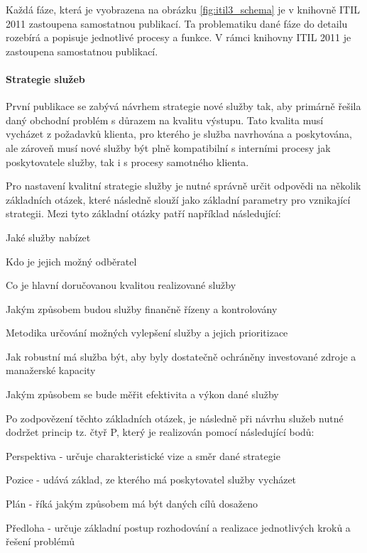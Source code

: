 \documentclass[
  digital,     %
  twoside,     %
  lof,         %
  lot,         %
]{fithesis4}
\begin{document}
Každá fáze, která je vyobrazena na obrázku \ref{fig:itil3_schema} je v knihovně ITIL 2011 zastoupena samostatnou publikací. Ta problematiku dané fáze do detailu rozebírá a popisuje jednotlivé procesy a funkce. V rámci knihovny ITIL 2011 je zastoupena samostatnou publikací. 
\paragraph{Strategie služeb}
První publikace se zabývá návrhem strategie nové služby tak, aby primárně řešila daný obchodní problém s důrazem na kvalitu výstupu. Tato kvalita musí vycházet z požadavků klienta, pro kterého je služba navrhována a poskytována, ale zároveň musí nové služby být plně kompatibilní s interními procesy jak poskytovatele služby, tak i s procesy samotného klienta.\parencite[s.~12-13]{Carlidge2007}

Pro nastavení kvalitní strategie služby je nutné správně určit odpovědi na několik základních otázek, které následně slouží jako základní parametry pro vznikající strategii.\parencite[s.~32]{Matula2017} Mezi tyto základní otázky patří například následující:

\begin{compactitem}
  \item Jaké služby nabízet
  \item Kdo je jejich možný odběratel
  \item Co je hlavní doručovanou kvalitou realizované služby
  \item Jakým způsobem budou služby finančně řízeny a kontrolovány
  \item Metodika určování možných vylepšení služby a jejich prioritizace
  \item Jak robustní má služba být, aby byly dostatečně ochráněny investované zdroje a manažerské kapacity
  \item Jakým způsobem se bude měřit efektivita a výkon dané služby
\end{compactitem}

Po zodpovězení těchto základních otázek, je následně při návrhu služeb nutné dodržet princip tz. čtyř P, který je realizován pomocí následující bodů:\parencite[s.~13]{Carlidge2007}
\begin{compactitem}
    \item Perspektiva - určuje charakteristické vize a směr dané strategie
    \item Pozice - udává základ, ze kterého má poskytovatel služby vycházet
    \item Plán - říká jakým způsobem má být daných cílů dosaženo
    \item Předloha - určuje základní postup rozhodování a realizace jednotlivých kroků a řešení problémů
\end{compactitem}
\end{document}
